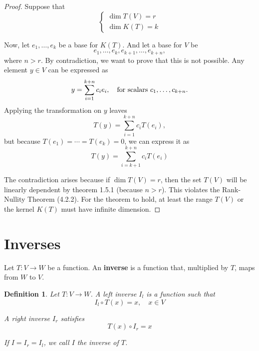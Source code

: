 \documentclass{book}
\newtheorem{definition}{Definition}[section]
\begin{document}
\begin{proof}
    Suppose that
    \begin{equation*}
        \begin{cases}
            \dim T(V) = r \\
            \dim K(T) = k
        \end{cases}
    \end{equation*}

    Now, let $e_1,\dots,e_k$ be a base for $K(T)$. And let a base for $V$ be
    \begin{equation*}
        e_1,\dots,e_k,e_{k+1},\dots,e_{k+n},
    \end{equation*}
    where $n > r$. By contradiction, we want to prove that this is not
    possible. Any element $y\in V$ can be expressed as
    \begin{equation*}
        y=\sum_{i=1}^{k+n}{c_i e_i},\quad \textnormal{for scalars } c_1,\dots,c_{k+n}.
    \end{equation*}
    Applying the transformation on $y$ leaves
    \begin{equation*}
        T(y) = \sum_{i=1}^{k+n}{c_i T(e_i)},
    \end{equation*}
    but because $T(e_1) = \cdots = T(e_k) = 0$, we can express it as
    \begin{equation*}
        T(y) = \sum_{i=k+1}^{k+n}{c_i T(e_i)}
    \end{equation*}

    The contradiction arises because if $\dim T(V) = r$, then the set $T(V)$ will
    be linearly dependent by theorem 1.5.1 (because $n>r$). This violates the
    Rank-Nullity Theorem (4.2.2). For the theorem to hold, at least the range
    $T(V)$ or the kernel $K(T)$ must have infinite dimension.
\end{proof}

\section{Inverses}

Let $T: V \to W$ be a function. An \textbf{inverse} is a function that,
multiplied by $T$, maps from $W$ to $V$.

\begin{definition}
    Let $T: V \to W$. A left inverse $I_l$ is a function such that
    \begin{equation}
        I_l \circ T(x) = x,\quad x\in V
    \end{equation}

    A right inverse $I_r$ satisfies
    \begin{equation}
        T(x)\circ I_r = x
    \end{equation}

    If $I = I_r = I_l$, we call $I$ the inverse of $T$.
\end{definition}
\end{document}
